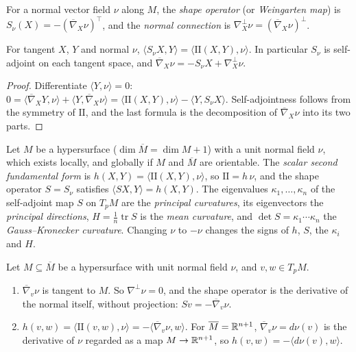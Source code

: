 \begin{definition}\label{riemannian-geometry:definition-shape-operator}
For a normal vector field $\nu$ along $M$, the \emph{shape operator} (or \emph{Weingarten map}) is $S_\nu(X) = -(\overline{\nabla}_X\nu)^\top$, and the \emph{normal
connection} is $\nabla^\perp_X\nu = (\overline{\nabla}_X\nu)^\perp$.
\end{definition}

\begin{proposition}\label{riemannian-geometry:proposition-weingarten}
For tangent $X$, $Y$ and normal $\nu$, $\langle S_\nu X, Y\rangle = \langle\mathrm{II}(X, Y), \nu\rangle$. In particular $S_\nu$ is self-adjoint on each tangent space, and
$\overline{\nabla}_X\nu = -S_\nu X + \nabla^\perp_X\nu$.
\end{proposition}

\begin{proof}
Differentiate $\langle Y, \nu\rangle = 0$: $0 = \langle\overline{\nabla}_XY, \nu\rangle + \langle Y, \overline{\nabla}_X\nu\rangle = \langle\mathrm{II}(X, Y), \nu\rangle - \langle Y, S_\nu X\rangle$. Self-adjointness
follows from the symmetry of $\mathrm{II}$, and the last formula is the decomposition of $\overline{\nabla}_X\nu$ into its two parts.
\end{proof}

\begin{definition}\label{riemannian-geometry:definition-hypersurface-curvatures}
Let $M$ be a hypersurface ($\dim\overline{M} = \dim M + 1$) with a unit normal field $\nu$, which exists locally, and globally if $M$ and $\overline{M}$ are orientable.
The \emph{scalar second fundamental form} is $h(X, Y) = \langle\mathrm{II}(X, Y), \nu\rangle$, so $\mathrm{II} = h\,\nu$, and the shape operator $S = S_\nu$ satisfies
$\langle SX, Y\rangle = h(X, Y)$. The eigenvalues $\kappa_1, \ldots, \kappa_n$ of the self-adjoint map $S$ on $T_pM$ are the \emph{principal curvatures}, its eigenvectors the
\emph{principal directions}, $H = \frac1n\operatorname{tr}S$ is the \emph{mean curvature}, and $\det S = \kappa_1 \cdots \kappa_n$ the \emph{Gauss--Kronecker
curvature}. Changing $\nu$ to $-\nu$ changes the signs of $h$, $S$, the $\kappa_i$ and $H$.
\end{definition}

\begin{proposition}\label{riemannian-geometry:proposition-normal-derivative}
Let $M \subseteq \overline{M}$ be a hypersurface with unit normal field $\nu$, and $v, w \in T_pM$.
\begin{enumerate}
\item $\overline{\nabla}_v\nu$ is tangent to $M$. So $\nabla^\perp\nu = 0$, and the shape operator is the derivative of the normal itself, without projection: $S v = -\overline{\nabla}_v\nu$.
\item $h(v, w) = \langle\mathrm{II}(v, w), \nu\rangle = -\langle\overline{\nabla}_v\nu, w\rangle$. For $\overline{M} = \mathbb{R}^{n+1}$, $\overline{\nabla}_v\nu = d\nu(v)$ is the derivative of $\nu$ regarded as a map $M \to \mathbb{R}^{n+1}$, so
$h(v, w) = -\langle d\nu(v), w\rangle$.
\end{enumerate}
\end{proposition}

